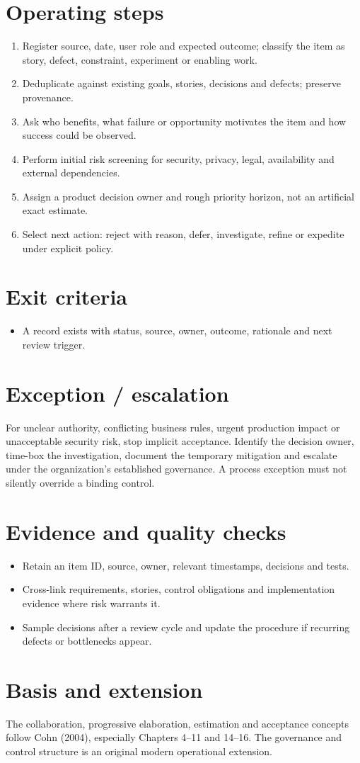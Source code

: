 \documentclass[11pt,letterpaper]{article}
\begin{document}
\section{Operating steps}
\begin{enumerate}[leftmargin=*,itemsep=3pt]
\item Register source, date, user role and expected outcome; classify the item as story, defect, constraint, experiment or enabling work.
\item Deduplicate against existing goals, stories, decisions and defects; preserve provenance.
\item Ask who benefits, what failure or opportunity motivates the item and how success could be observed.
\item Perform initial risk screening for security, privacy, legal, availability and external dependencies.
\item Assign a product decision owner and rough priority horizon, not an artificial exact estimate.
\item Select next action: reject with reason, defer, investigate, refine or expedite under explicit policy.
\end{enumerate}
\section{Exit criteria}
\begin{itemize}[leftmargin=*,itemsep=2pt]
\item A record exists with status, source, owner, outcome, rationale and next review trigger.
\end{itemize}
\section{Exception / escalation}
For unclear authority, conflicting business rules, urgent production impact or unacceptable security risk, stop implicit acceptance. Identify the decision owner, time-box the investigation, document the temporary mitigation and escalate under the organization’s established governance. A process exception must not silently override a binding control.

\section{Evidence and quality checks}
\begin{itemize}[leftmargin=*,itemsep=2pt]
\item Retain an item ID, source, owner, relevant timestamps, decisions and tests.
\item Cross-link requirements, stories, control obligations and implementation evidence where risk warrants it.
\item Sample decisions after a review cycle and update the procedure if recurring defects or bottlenecks appear.
\end{itemize}
\section{Basis and extension}
The collaboration, progressive elaboration, estimation and acceptance concepts follow Cohn (2004), especially Chapters 4–11 and 14–16. The governance and control structure is an original modern operational extension.
\end{document}
